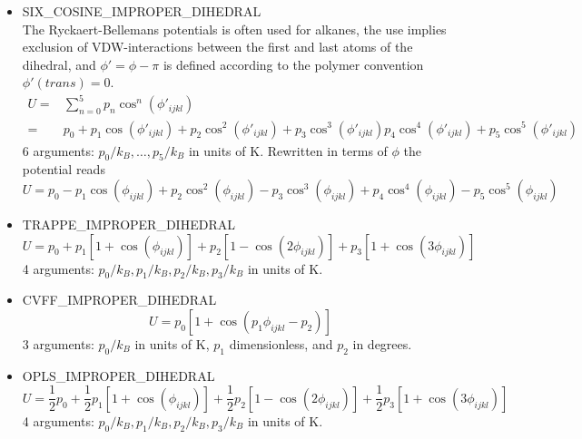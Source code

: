 \begin{itemize}
  \item{SIX\_COSINE\_IMPROPER\_DIHEDRAL}\\
  The Ryckaert-Bellemans potentials is often used for alkanes, the use implies exclusion of VDW-interactions
  between the first and last atoms of the dihedral, and $\phi'=\phi-\pi$ is defined according to the
  polymer convention $\phi'(trans)=0$.
  \begin{align}
  U=&\sum_{n=0}^5 p_n \cos^n\left(\phi'_{ijkl}\right)\\
    =&p_0+p_1\cos\left(\phi'_{ijkl}\right)+p_2\cos^2\left(\phi'_{ijkl}\right)+p_3\cos^3\left(\phi'_{ijkl}\right)
    p_4\cos^4\left(\phi'_{ijkl}\right)+p_5\cos^5\left(\phi'_{ijkl}\right)
  \end{align}
  6 arguments: $p_0/k_B,\dots,p_5/k_B$ in units of K.
  Rewritten in terms of $\phi$ the potential reads
  \begin{equation}
  U=p_0-p_1\cos\left(\phi_{ijkl}\right)+p_2\cos^2\left(\phi_{ijkl}\right)
    -p_3\cos^3\left(\phi_{ijkl}\right)+p_4\cos^4\left(\phi_{ijkl}\right)
    -p_5\cos^5\left(\phi_{ijkl}\right)
  \end{equation}

  \item{TRAPPE\_IMPROPER\_DIHEDRAL}\\
  \begin{equation}
  U=p_0+p_1\left[1+\cos\left(\phi_{ijkl}\right)\right]+
        p_2\left[1-\cos\left(2\phi_{ijkl}\right)\right]+
        p_3\left[1+\cos\left(3\phi_{ijkl}\right)\right]
  \end{equation}
  4 arguments: $p_0/k_B,p_1/k_B,p_2/k_B,p_3/k_B$ in units of K.

  \item{CVFF\_IMPROPER\_DIHEDRAL}\\
  \begin{equation}
  U=p_0\left[1+\cos\left(p_1\phi_{ijkl}-p_2\right)\right]
  \end{equation}
  3 arguments: $p_0/k_B$ in units of K, $p_1$ dimensionless, and $p_2$ in degrees.

  \item{OPLS\_IMPROPER\_DIHEDRAL}\\
  \begin{equation}
  U= \frac{1}{2}p_0+
    \frac{1}{2}p_1\left[1+\cos\left(\phi_{ijkl}\right)\right]+
    \frac{1}{2}p_2\left[1-\cos\left(2\phi_{ijkl}\right)\right]+
    \frac{1}{2}p_3\left[1+\cos\left(3\phi_{ijkl}\right)\right]
  \end{equation}
  4 arguments: $p_0/k_B,p_1/k_B,p_2/k_B,p_3/k_B$ in units of K.


\end{itemize}
